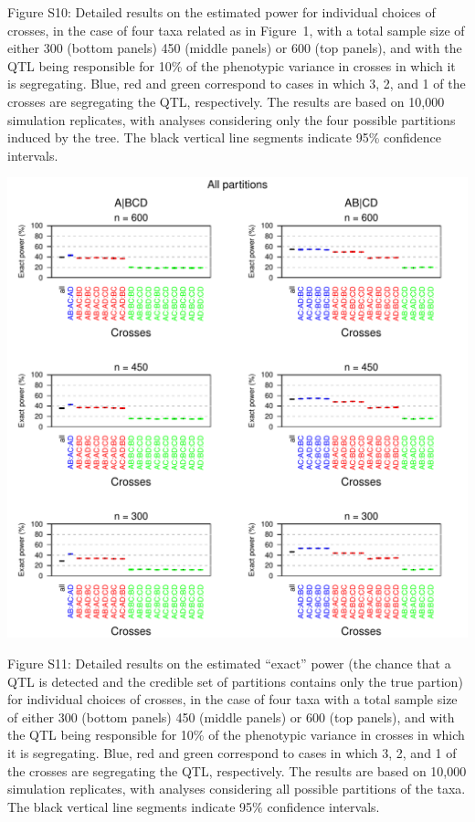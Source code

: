 \documentclass[letterpaper,twoside]{article}
\begin{document}
\bigskip \noindent
Figure S10: Detailed results on the estimated power for individual
  choices of crosses, in the case of four taxa related as in Figure~1,
  with a total sample size of either 300 (bottom panels) 450 (middle
  panels) or 600 (top panels), and with the QTL being responsible
  for 10\% of the phenotypic variance in crosses in which it is
  segregating. Blue, red and green correspond to cases in which 3, 2,
  and 1 of the crosses are segregating the QTL, respectively.  The
  results are based on 10,000 simulation replicates, with analyses
  considering only the four possible partitions induced by the tree.
  The black vertical line segments indicate 95\% confidence intervals.

\newpage

{\centering
\includegraphics{SuppFigs/detailedexpower_allpart.pdf}}

\bigskip \noindent
Figure S11: Detailed results on the estimated ``exact'' power
  (the chance that a QTL is detected and the
credible set of partitions contains only the true partion) for individual choices of crosses, in the case of four taxa
  with a total sample size of either 300 (bottom panels)
  450 (middle panels) or 600 (top panels),
  and with the QTL being responsible
  for 10\% of the phenotypic variance in crosses in which it is
  segregating. Blue, red and green correspond to cases in which 3, 2,
  and 1 of the crosses are segregating the QTL, respectively.  The
  results are based on 10,000 simulation replicates, with analyses
  considering all possible partitions of the taxa.  The black vertical
  line segments indicate 95\% confidence
  intervals.
\end{document}
